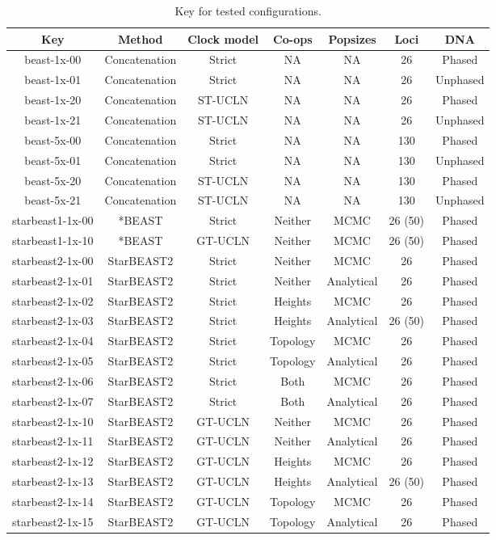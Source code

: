 \documentclass[12pt]{article}
\begin{document}
\begin{table}[htb!]
\centering
\caption{Key for tested configurations.}
\label{tab:configurationKey}
\begin{threeparttable}
\begin{adjustbox}{center}
\begin{tabular}{|c|c|c|c|c|c|c|}
\hline
Key & Method & Clock model & Co-ops & Popsizes & Loci & DNA\tabularnewline
\hline
beast-1x-00 & Concatenation & Strict & NA & NA & 26 & Phased\tabularnewline
\hline
beast-1x-01 & Concatenation & Strict & NA & NA & 26 & Unphased\tabularnewline
\hline
beast-1x-20 & Concatenation & ST-UCLN & NA & NA & 26 & Phased\tabularnewline
\hline
beast-1x-21 & Concatenation & ST-UCLN & NA & NA & 26 & Unphased\tabularnewline
\hline
beast-5x-00 & Concatenation & Strict & NA & NA & 130 & Phased\tabularnewline
\hline
beast-5x-01 & Concatenation & Strict & NA & NA & 130 & Unphased\tabularnewline
\hline
beast-5x-20 & Concatenation & ST-UCLN & NA & NA & 130 & Phased\tabularnewline
\hline
beast-5x-21 & Concatenation & ST-UCLN & NA & NA & 130 & Unphased\tabularnewline
\hline
starbeast1-1x-00 & *BEAST & Strict & Neither & MCMC & 26 (50) & Phased\tabularnewline
\hline
starbeast1-1x-10 & *BEAST & GT-UCLN & Neither & MCMC & 26 (50) & Phased\tabularnewline
\hline
starbeast2-1x-00 & StarBEAST2 & Strict & Neither & MCMC & 26 & Phased\tabularnewline
\hline
starbeast2-1x-01 & StarBEAST2 & Strict & Neither & Analytical & 26 & Phased\tabularnewline
\hline
starbeast2-1x-02 & StarBEAST2 & Strict & Heights & MCMC & 26 & Phased\tabularnewline
\hline
starbeast2-1x-03 & StarBEAST2 & Strict & Heights & Analytical & 26 (50) & Phased\tabularnewline
\hline
starbeast2-1x-04 & StarBEAST2 & Strict & Topology & MCMC & 26 & Phased\tabularnewline
\hline
starbeast2-1x-05 & StarBEAST2 & Strict & Topology & Analytical & 26 & Phased\tabularnewline
\hline
starbeast2-1x-06 & StarBEAST2 & Strict & Both & MCMC & 26 & Phased\tabularnewline
\hline
starbeast2-1x-07 & StarBEAST2 & Strict & Both & Analytical & 26 & Phased\tabularnewline
\hline
starbeast2-1x-10 & StarBEAST2 & GT-UCLN & Neither & MCMC & 26 & Phased\tabularnewline
\hline
starbeast2-1x-11 & StarBEAST2 & GT-UCLN & Neither & Analytical & 26 & Phased\tabularnewline
\hline
starbeast2-1x-12 & StarBEAST2 & GT-UCLN & Heights & MCMC & 26 & Phased\tabularnewline
\hline
starbeast2-1x-13 & StarBEAST2 & GT-UCLN & Heights & Analytical & 26 (50) & Phased\tabularnewline
\hline
starbeast2-1x-14 & StarBEAST2 & GT-UCLN & Topology & MCMC & 26 & Phased\tabularnewline
\hline
starbeast2-1x-15 & StarBEAST2 & GT-UCLN & Topology & Analytical & 26 & Phased\tabularnewline

\end{tabular}
\end{adjustbox}
\end{threeparttable}
\end{table}
\end{document}

